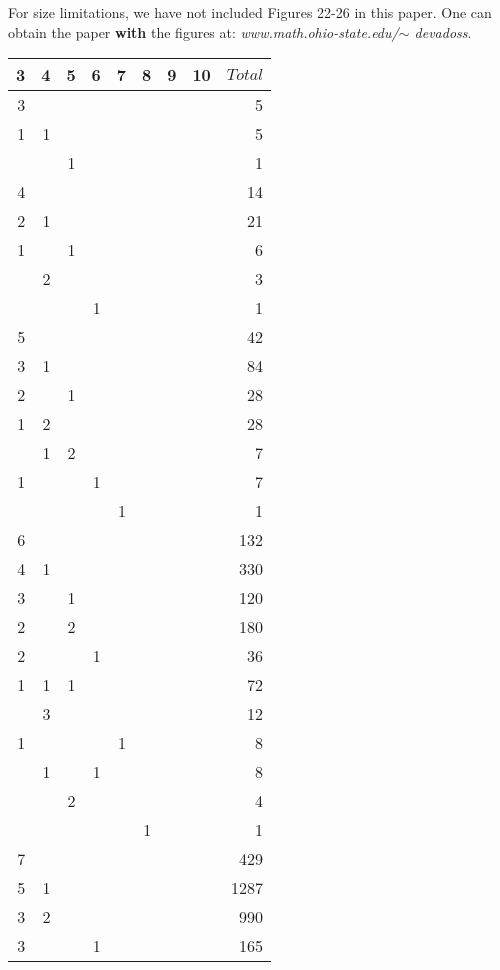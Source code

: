 \documentclass[10pt]{amsart}
\begin{document}
\begin{rem}
For size limitations, we have not included Figures 22-26 in this paper.  One can obtain the paper {\bf with} the figures at:  {\em www.math.ohio-state.edu/$\sim$ devadoss}.
\end{rem}

\clearpage

%
%

\begin{table}[h]
{\scriptsize \begin{tabular}{|rrrrrrrrr|} \hline
3 & 4 & 5 & 6 & 7 & 8 & 9 & 10 & $Total$ \\ \hline
3 &&&&&&&& 5 \\ 
1 & 1 &&&&&&& 5 \\
&& 1 &&&&&& 1 \\ \hline
4 &&&&&&&& 14 \\ 
2 & 1 &&&&&&& 21 \\
1 && 1 &&&&&& 6 \\ 
& 2 &&&&&&& 3 \\
&&& 1 &&&&& 1 \\ \hline
5 &&&&&&&& 42 \\ 
3 & 1 &&&&&&& 84 \\
2 && 1 &&&&&& 28 \\
1 & 2 &&&&&&& 28 \\
& 1 & 2 &&&&&& 7 \\
1 &&& 1 &&&&& 7 \\
&&&& 1 &&&& 1 \\ \hline
6 &&&&&&&& 132 \\
4 & 1 &&&&&&& 330 \\
3 && 1 &&&&&& 120 \\
2 && 2 &&&&&& 180 \\
2 &&& 1 &&&&& 36 \\
1 & 1 & 1 &&&&&& 72 \\
& 3 &&&&&&& 12 \\
1 &&&& 1 &&&& 8 \\
& 1 && 1 &&&&& 8 \\
&& 2 &&&&&& 4 \\ 
&&&&& 1 &&& 1 \\ \hline
7 &&&&&&&& 429 \\
5 & 1 &&&&&&& 1287 \\ 
3 & 2 &&&&&&& 990 \\
3 &&& 1 &&&&& 165 \\

\end{tabular}}
\end{table}
\end{document}
